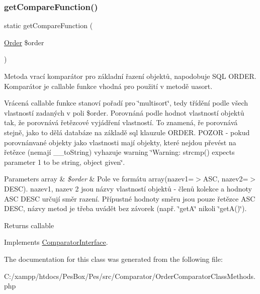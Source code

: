 \subsubsection{\texorpdfstring{get\+Compare\+Function()}{getCompareFunction()}}
{\footnotesize\ttfamily static get\+Compare\+Function (\begin{DoxyParamCaption}\item[{\mbox{\hyperlink{class_pes_1_1_query_1_1_order}{Order}}}]{\$order }\end{DoxyParamCaption})\hspace{0.3cm}{\ttfamily [static]}}

Metoda vrací komparátor pro základní řazení objektů, napodobuje S\+QL O\+R\+D\+ER. Komparátor je callable funkce vhodná pro použití v metodě uasort.

Vrácená callable funkce stanoví pořadí pro \char`\"{}multisort\char`\"{}, tedy třídění podle všech vlastností zadaných v poli \$order. Porovnáná podle hodnot vlastností objektů tak, že porovnává řetězcové vyjádření vlastností. To znamená, ře porovnává stejně, jako to dělá databáze na základě sql klauzule O\+R\+D\+ER. P\+O\+Z\+OR -\/ pokud porovnánvané objekty jako vlastnosti mají objekty, které nejdou převést na řetězce (nemají \+\_\+\+\_\+to\+String) vyhazuje warning \char`\"{}\+Warning\+: strcmp() expects parameter 1 to be string, object given\char`\"{}.


\begin{DoxyParams}[1]{Parameters}
array & {\em \$order} & Pole ve formátu array(\textquotesingle{}nazev1\textquotesingle{}=$>$\textquotesingle{}A\+SC\textquotesingle{}, \textquotesingle{}nazev2=$>$\textquotesingle{}D\+E\+SC\textquotesingle{}). nazev1, nazev 2 jsou názvy vlastností objektů -\/ členů kolekce a hodnoty \textquotesingle{}A\+SC\textquotesingle{} \textquotesingle{}D\+E\+SC\textquotesingle{} určují směr razení. Přípustné hodnoty směru jsou pouze řetězce \textquotesingle{}A\+SC\textquotesingle{} \textquotesingle{}D\+E\+SC\textquotesingle{}, názvy metod je třeba uvádět bez závorek (např. \char`\"{}get\+A\char`\"{} nikoli \char`\"{}get\+A()\char`\"{}). \\
\hline
\end{DoxyParams}
\begin{DoxyReturn}{Returns}
callable 
\end{DoxyReturn}


Implements \mbox{\hyperlink{interface_pes_1_1_comparator_1_1_comparator_interface_a21aeb75d37fce6724b5a60f836dfc85c}{Comparator\+Interface}}.



The documentation for this class was generated from the following file\+:\begin{DoxyCompactItemize}
\item 
C\+:/xampp/htdocs/\+Pes\+Box/\+Pes/src/\+Comparator/Order\+Comparator\+Class\+Methods.\+php\end{DoxyCompactItemize}

